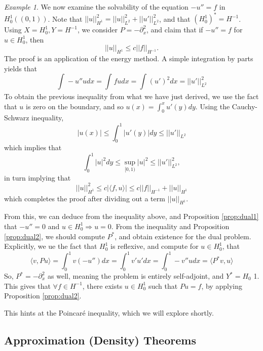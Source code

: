 \documentclass[letterpaper,10pt]{article}
\theoremstyle{definition}
\theoremstyle{remark}
\newtheorem*{eg}{Example}
\theoremstyle{plain}
\begin{document}
\begin{eg}
    We now examine the solvability of the equation $-u''=f$ in $H_0^1((0,1))$.
    Note that $||u||^2_{H^1}=||u||^2_{L^2}+||u'||^2_{L^2}$, and that 
    $(H_0^1)^*=H^{-1}$.
    Using $X=H_0^1, Y=H^{-1}$, we consider $P=-\partial_x^2$, and claim that 
    if $-u''=f$ for $u\in H_0^1$, then $$||u||_{H^1}\leq c||f||_{H^{-1}}.$$
    The proof is an application of the energy method.
    A simple integration by parts yields that 
    $$
    \int_{}^{}-u''udx=\int_{}^{}fudx=\int_{}^{}(u')^2dx=||u'||^2_{L^2}
    $$
    To obtain the previous inequality from what we have just derived, we use the fact that
    $u$ is zero on the boundary, and so $u(x)=\int_{0}^{x}u'(y)dy$.
    Using the Cauchy-Schwarz inequality,
    $$
    |u(x)|\leq\int_{0}^{1}|u'(y)|dy\leq ||u'||_{L^2}
    $$
    which implies that 
    $$
    \int_{0}^{1}|u|^2dy\leq\sup_{[0,1)}|u|^2\leq||u'||^2_{L^2},
    $$
    in turn implying that 
    $$
    ||u||^2_{H^1}\leq c|\langle f,u\rangle|\leq c||f||_{H^{-1}}+||u||_{H^1}
    $$
    which completes the proof after dividing out a term $||u||_{H^1}$.

    From this, we can deduce from the inequality above, and Proposition \ref{prop:dual1}
    that $-u''=0$ and $u\in H_0^1\Rightarrow u=0$.
    From the inequality and Proposition \ref{prop:dual2}, we should compute $P^*$,
    and obtain existence for the dual problem.
    Explicitly, we ue the fact that $H_0^1$ is reflexive, and compute
    for $u\in H_0^1$, that 
    $$
    \langle v, Pu\rangle=\int_{0}^{1}v(-u'')dx=\int_{0}^{1}v'u'dx=\int_{0}^{1}-v''udx
    =\langle P^*v,u\rangle
    $$
    So, $P^*=-\partial_x^2$ as well, meaning the problem is entirely self-adjoint, and 
    $Y^*=H_0$ 1. This gives that $\forall f\in H^{-1}$, there exists $u\in H_0^1$ such that 
    $Pu=f$, by applying Proposition \ref{prop:dual2}.
\end{eg}
This hints at the Poincar\'e inequality, which we will explore shortly.

\subsection{Approximation (Density) Theorems}
\end{document}
